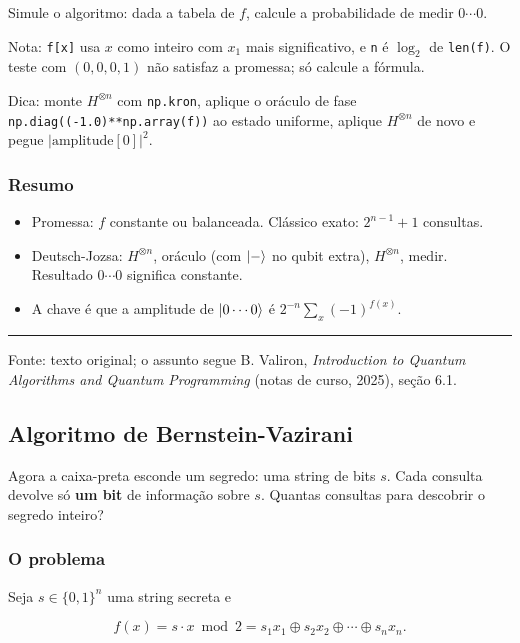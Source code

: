Simule o algoritmo: dada a tabela de \(f\), calcule a probabilidade de medir \(0\cdots0\).

Nota: \texttt{f{[}x{]}} usa \(x\) como inteiro com \(x_1\) mais significativo, e \texttt{n} é \(\log_2\) de \texttt{len(f)}. O teste com \((0,0,0,1)\) não satisfaz a promessa; só calcule a fórmula.

Dica: monte \(H^{\otimes n}\) com \texttt{np.kron}, aplique o oráculo de fase \texttt{np.diag((-1.0)**np.array(f))} ao estado uniforme, aplique \(H^{\otimes n}\) de novo e pegue \(|\text{amplitude}[0]|^2\).

\subsubsection{Resumo}\label{resumo}

\begin{itemize}
\tightlist
\item
  Promessa: \(f\) constante ou balanceada. Clássico exato: \(2^{n-1}+1\) consultas.
\item
  Deutsch-Jozsa: \(H^{\otimes n}\), oráculo (com \(\left|{-}\right>\) no qubit extra), \(H^{\otimes n}\), medir. Resultado \(0\cdots0\) significa constante.
\item
  A chave é que a amplitude de \(\left|{0\cdots0}\right>\) é \(2^{-n}\sum_x(-1)^{f(x)}\).
\end{itemize}

\begin{center}\rule{0.5\linewidth}{0.5pt}\end{center}

Fonte: texto original; o assunto segue B. Valiron, \emph{Introduction to Quantum Algorithms and Quantum Programming} (notas de curso, 2025), seção 6.1.

\subsection{Algoritmo de Bernstein-Vazirani}
Agora a caixa-preta esconde um segredo: uma string de bits \(s\). Cada consulta devolve só \textbf{um bit} de informação sobre \(s\). Quantas consultas para descobrir o segredo inteiro?

\subsubsection{O problema}\label{o-problema}

Seja \(s\in\{0,1\}^n\) uma string secreta e

\[
f(x)=s\cdot x \bmod 2 = s_1x_1\oplus s_2x_2\oplus\cdots\oplus s_nx_n.
\]

